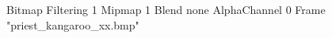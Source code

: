 {Bitmap
	{Filtering 1}
	{Mipmap 1}
	{Blend none}
	{AlphaChannel 0}
	{Frame "priest_kangaroo_xx.bmp"}
}
